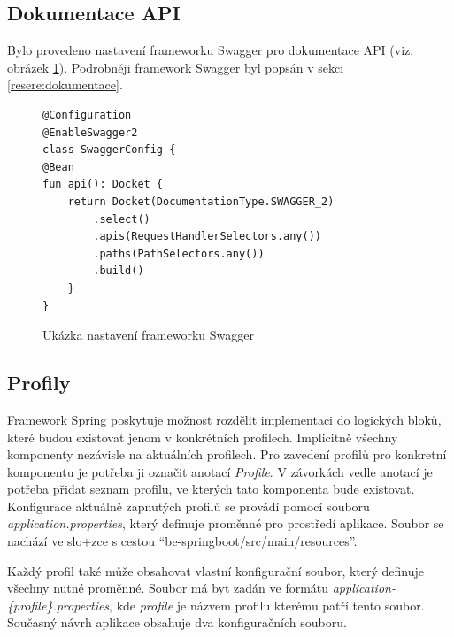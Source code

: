     \subsection{Dokumentace API}
        Bylo provedeno nastavení frameworku Swagger pro dokumentace API (viz. obrázek \ref{code:swagger-configuration}). Podrobněji framework Swagger byl popsán v sekci \ref{resere:dokumentace}.
        \begin{figure}
        \begin{verbatim}
@Configuration
@EnableSwagger2
class SwaggerConfig {
@Bean
fun api(): Docket {
    return Docket(DocumentationType.SWAGGER_2)
        .select()
        .apis(RequestHandlerSelectors.any())
        .paths(PathSelectors.any())
        .build()
    }
}
        \end{verbatim}
        \caption{Ukázka nastavení frameworku Swagger}\label{code:swagger-configuration}
        \end{figure}
    
    \subsection{Profily}\label{analyza:soucasnaImplementace:profily}
        Framework Spring poskytuje možnost rozdělit implementaci do logických bloků, které budou existovat jenom v konkrétních profilech\cite{spring-profile}. Implicitně všechny komponenty nezávisle na aktuálních profilech. Pro zavedení profilů pro konkretní komponentu je potřeba ji označit anotací \textit{Profile}. V závorkách vedle anotací je potřeba přidat seznam profilu, ve kterých tato komponenta bude existovat. Konfigurace aktuálně zapnutých profilů se provádí pomocí souboru \textit{application.properties}, který definuje proměnné pro prostředí aplikace. Soubor se nachází ve slo+zce s cestou \enquote{be-springboot/src/main/resources}.
    
        Každý profil také může obsahovat vlastní konfigurační soubor, který definuje všechny nutné proměnné. Soubor má byt zadán ve formátu \textit{application-\{profile\}.properties}, kde \textit{profile} je názvem profilu kterému patří tento soubor. Současný návrh aplikace obsahuje dva konfiguračních souboru.
    
